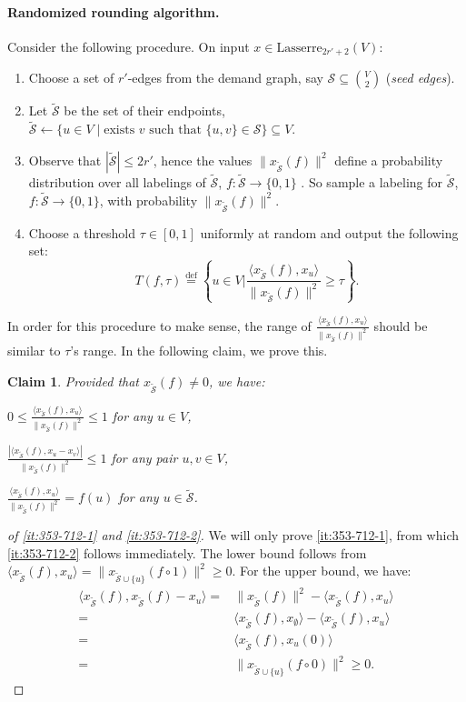 \documentclass{article}
\def\triangleq{\overset{\mathrm{def}}{=}}
\newtheorem{claim}{Claim}[section]
\let\es=\emptyset
\newcommand{\lasserreii}[2]{\mathrm{Lasserre}_{#1}(#2)}
\newcommand{\xvec}{\vec{x}} \newcommand{\yvec}{\vec{y}} \newcommand{\xmat}{\vec{X}} \newcommand{\ymat}{\vec{Y}} \newcommand{\zmat}{\vec{Z}}
\newcounter{alg-count}
\def\vec{}
\newcommand{\sde}{{\mathcal{S}}}
\newcommand{\sdn}{{\widetilde{\mathcal{S}}}}
\begin{document}
\paragraph{Randomized rounding algorithm.} 
Consider the following procedure.
On input $\xvec \in \lasserreii{2 r' +2}{V}$:
\begin{enumerate}
\item Choose a set of $r'$-edges from the demand graph, say $\sde
  \subseteq \binom{V}{2}$ ({\em seed edges}).
\item Let $\sdn$ be the set of their endpoints, $\sdn \gets \{ u \in V
  \mid \mbox{exists $v$ such that $\{u,v\}\in \sde$} \} \subseteq V$.
\item Observe that $|\sdn| \le 2 r'$, hence the values
  $\big\|\xvec_\sdn(f)\big\|^2$ define a probability distribution over
  all labelings of $\sdn$, $f:\sdn \to\{0,1\}$ .  So sample a labeling
  for $\sdn$, $f:\sdn\to\{0,1\}$, with probability
  $\|\xvec_\sdn(f)\|^2$.
\item Choose a threshold $\tau \in [0,1]$ uniformly at random and
  output the following set:
\[
T(f,\tau) \triangleq \left\{ u \in V \bigg| \frac{\langle
    \xvec_\sdn(f), \xvec_u \rangle}{\|\xvec_\sdn(f)\|^2 } \ge \tau
\right\}.
\]
\end{enumerate}
In order for this procedure to make sense, the range of $
\frac{\langle \xvec_\sdn(f), \xvec_u \rangle}{\|\xvec_\sdn(f)\|^2 }$
should be similar to $\tau$'s range. In the following claim, we prove
this.
\begin{claim} \label{clm:tau-ulb}
Provided that $\xvec_\sdn(f) \neq 0$, we have:
\begin{inparaenum}[(i)]
\item \label{it:353-712-1} $0 \le \frac{\langle \xvec_\sdn(f), \xvec_u
    \rangle}{\|\xvec_\sdn(f)\|^2 } \le 1$ for any $u\in V$,
\item \label{it:353-712-2} $\frac{\left|\langle \xvec_\sdn(f), \xvec_u
      - \xvec_v \rangle\right|}{\|\xvec_\sdn(f)\|^2 } \le 1$ for any
  pair $u,v \in V$,
\item \label{it:353-712-3} $\frac{\langle \xvec_\sdn(f), \xvec_u
    \rangle}{\|\xvec_\sdn(f)\|^2} = f(u)$ for any $u \in \sdn$.
\end{inparaenum}
\end{claim}
\begin{proof}[of \eqref{it:353-712-1} and \eqref{it:353-712-2}]
  We will only prove \eqref{it:353-712-1}, from which
  \eqref{it:353-712-2} follows immediately.  The lower bound follows
  from $\langle \xvec_\sdn(f), \xvec_u \rangle = \|
  \xvec_{\sdn\cup\{u\}}(f\circ 1) \|^2 \ge 0$. For the upper bound, we
  have:
\begin{align*}
  \langle \xvec_\sdn(f), \xvec_\sdn(f) - \xvec_u \rangle
  =&  \|\xvec_\sdn(f)\|^2 - \langle \xvec_\sdn(f), \xvec_u \rangle \\
  =  & \langle \xvec_\sdn(f), \xvec_{\es}\rangle  
  - \langle \xvec_\sdn(f),\xvec_u \rangle \\
  =&  \langle \xvec_\sdn(f),\xvec_u(0) \rangle \\
  = & \| \xvec_{\sdn\cup\{u\}}(f\circ 0) \|^2\ge 0. \tag*{\qedhere}
\end{align*} 
\end{proof}
\end{document}

